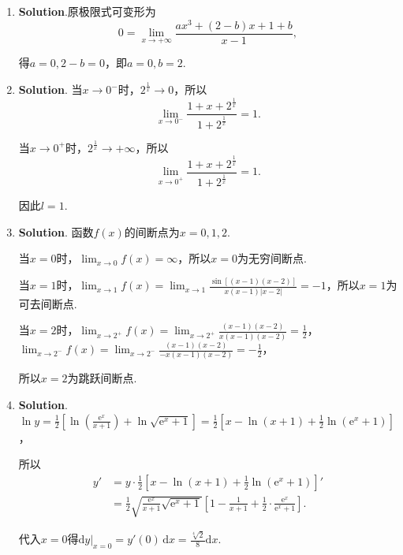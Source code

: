 \documentclass[../Main.tex]{subfiles}
\begin{document}
\begin{enumerate}
    \item \textbf{Solution}.原极限式可变形为
          \[
              0=\lim_{x\to+\infty}\frac{ax^{3}+(2-b)x+1+b}{x-1},
          \]

          得$a=0,2-b=0$，即$a=0,b=2$.

    \item \textbf{Solution}. 当$x\to0^{-}$时，$2^{\frac{1}{x}}\to0$，所以
          \[
              \lim_{x\to0^-}\frac{1+x+2^{\frac{1}{x}}}{1+2^{\frac{1}{x}}}=1.
          \]

          当$x\to0^{+}$时，$2^{\frac{1}{x}}\to+\infty$，所以
          \[
              \lim_{x\to0^+}\frac{1+x+2^{\frac{1}{x}}}{1+2^{\frac{1}{x}}}=1.
          \]

          因此$l=1$.

    \item \textbf{Solution}. 函数$f(x)$的间断点为$x=0,1,2$.

          当$x=0$时，$\lim_{x\to0}f(x)=\infty$，所以$x=0$为无穷间断点.

          当$x=1$时，$\lim_{x\to 1}f(x)=\lim_{x\to1}\frac{\sin[(x-1)(x-2)]}{x(x-1)|x-2|}
              =-1$，所以$x=1$为可去间断点.

          当$x=2$时，$\lim_{x\to 2^+}f(x)=\lim_{x\to2^+}\frac{(x-1)(x-2)}{x(x-1)(x-2)}
              =\frac{1}{2}$，$\lim_{x\to 2^-}f(x)=\lim_{x\to2^-}\frac{(x-1)(x-2)}{-x(x-1)(x-2)}
              =-\frac{1}{2}$，

          所以$x=2$为跳跃间断点.

    \item \textbf{Solution}. $\ln y=\frac{1}{2}\left[\ln\left(\frac{\mathrm{e}^{x}}{x+1}
                  \right)+\ln\sqrt{\mathrm{e}^{x}+1}\right]=\frac{1}{2}\left[x-\ln(x+1)+\frac{1}{2}
                  \ln(\mathrm{e}^{x}+1)\right]$，

          所以
          \[
              \begin{aligned}
                  y' & =y\cdot \frac{1}{2}\left[x-\ln(x+1)+\frac{1}{2}\ln(\mathrm{e}^{x}+1)\right]'                                                                      \\
                     & =\frac{1}{2}\sqrt{\frac{\mathrm{e}^x}{x+1}\sqrt{\mathrm{e}^x+1}}\left[1-\frac{1}{x+1}+\frac{1}{2}\cdot\frac{\mathrm{e}^x}{\mathrm{e}^x+1}\right].
              \end{aligned}
          \]

          代入$x=0$得$\left.\mathrm{d}y\right|_{x=0}=y'(0)\,\mathrm{d}x=\frac{\sqrt[4]{2}}{8}
              \mathrm{d}x$.


\end{enumerate}
\end{document}
